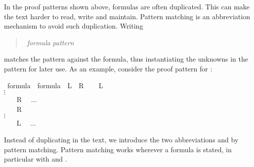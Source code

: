 \begin{isabellebody}
\begin{isamarkuptext}
In the proof patterns shown above, formulas are often duplicated.
This can make the text harder to read, write and maintain. Pattern matching
is an abbreviation mechanism to avoid such duplication. Writing
\begin{quote}
 \ \textit{formula}  \textit{pattern}
\end{quote}
matches the pattern against the formula, thus instantiating the unknowns in
the pattern for later use. As an example, consider the proof pattern for
:
\end{isamarkuptext}%
%
\isadelimproof
%
\endisadelimproof
%
\isatagproof
{}\isamarkupfalse%
\ {}formula\ {}\ formula\ {}\ {}{}L\ {}\ {}R{}{}\isanewline
{}\isamarkupfalse%
\isanewline
\ \ \isamarkupfalse%
\ {}{}L{}%
\\\mbox{}\quad$\vdots$\\\mbox{}\hspace{-1.4ex}
\ \ \isamarkupfalse%
\ {}{}R{}\ %
\ $\dots$\\
\isamarkupfalse%
\isanewline
\ \ \isamarkupfalse%
\ {}{}R{}%
\\\mbox{}\quad$\vdots$\\\mbox{}\hspace{-1.4ex}
\ \ \isamarkupfalse%
\ {}{}L{}\ %
\ $\dots$\\
\isamarkupfalse%
%
\endisatagproof
{\isafoldproof}%
%
\isadelimproof
%
\endisadelimproof
%
\begin{isamarkuptext}%
Instead of duplicating  in the text, we introduce
the two abbreviations  and  by pattern matching.
Pattern matching works wherever a formula is stated, in particular
with  and .


\end{isamarkuptext}
\end{isabellebody}

